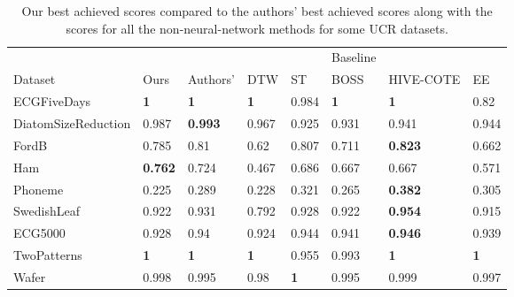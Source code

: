 \documentclass{article}
\begin{document}

\begin{table}[h!]
\caption{Our best achieved scores compared to the authors' best achieved scores along with the scores for all the non-neural-network methods for some UCR datasets.}
\label{tab:table1non}
\centering
\begin{tabular}{llllllll}
    \hline
                        &                &                & \vrule    &            &    Baseline        &          &  \\

    Dataset             & Ours           & Authors'       & \vrule   DTW        & ST         & BOSS       & HIVE-COTE      & EE         \\
    \hline
    ECGFiveDays         & \textbf{1}          & \textbf{1}     & \textbf{1}      & 0.984      & \textbf{1} & \textbf{1}     & 0.82       \\
    DiatomSizeReduction & 0.987 & \textbf{0.993} & 0.967      & 0.925      & 0.931      & 0.941          & 0.944      \\
    FordB               & 0.785          & 0.81           & 0.62       & 0.807      & 0.711      & \textbf{0.823} & 0.662      \\
    Ham                 & \textbf{0.762} & 0.724          & 0.467      & 0.686      & 0.667      & 0.667          & 0.571      \\
    Phoneme             & 0.225           & 0.289          & 0.228      & 0.321      & 0.265      & \textbf{0.382} & 0.305      \\
    SwedishLeaf         & 0.922          & 0.931          & 0.792      & 0.928      & 0.922      & \textbf{0.954} & 0.915      \\ \hdashline
    ECG5000             & 0.928          & 0.94          & 0.924      & 0.944      & 0.941      & \textbf{0.946} & 0.939      \\
    TwoPatterns         & \textbf{1}     & \textbf{1}     & \textbf{1} & 0.955      & 0.993      & \textbf{1}     & \textbf{1} \\
    Wafer               & 0.998          & 0.995          & 0.98       & \textbf{1} & 0.995      & 0.999          & 0.997      
    \end{tabular}
\end{table}
\end{document}
